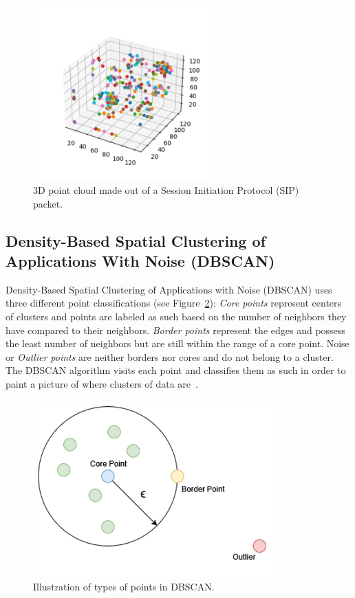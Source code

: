 \begin{figure} [ht!]
\centering
\includegraphics[width=0.6\textwidth]{chapters/6/img/sipcloud.png}
\caption{3D point cloud made out of a Session Initiation Protocol (SIP) packet.}
\label{fig:cloud}
\end{figure}

\subsection{Density-Based Spatial Clustering of Applications With Noise (DBSCAN)}

Density-Based Spatial Clustering of Applications with Noise (DBSCAN) uses three different point classifications (see Figure~\ref{fig:dbscan}): \textit{Core points} represent centers of clusters and points are labeled as such based on the number of neighbors they have compared to their neighbors. \textit{Border points} represent the edges and possess the least number of neighbors but are still within the range of a core point. Noise or \textit{Outlier points} are neither borders nor cores and do not belong to a cluster. The DBSCAN algorithm visits each point and classifies them as such in order to paint a picture of where clusters of data are~\cite{schubert2017dbscan}.

\begin{figure} [ht!]
\centering
\includegraphics[scale=0.4]{chapters/6/img/dbscan.drawio.png}
\caption{Illustration of types of points in DBSCAN.}
\label{fig:dbscan}
\end{figure}

